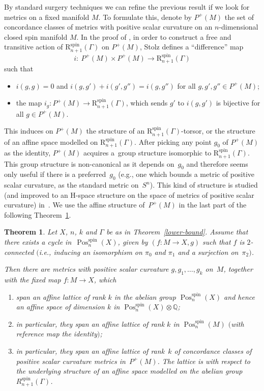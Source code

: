 \documentclass[pdftex]{sigma}
\numberwithin{equation}{section}
\newtheorem{Theorem}{Theorem}[section]
\newcommand{\rationals}{\mathbb{Q}}
\DeclareMathOperator{\Pos}{Pos}
\DeclareMathOperator{\spin}{spin}
\begin{document}
By standard surgery techniques we can refine the previous result if we look
 for metrics on a fixed manifold $M$. To formulate this, denote by $P^+(M)$ the set of concordance classes of metrics with positive scalar curvature on an $n$-dimensional closed spin manifold $M$.
 In the proof of \cite[Theorem~5.4]{Stolz}, in order to construct a free and
 transitive action of $\mathrm{R}^{\spin}_{n+1}(\Gamma)$ on $P^+(M)$, Stolz
 defines a ``difference'' map
 \begin{equation}\label{i-map}i\colon \ P^+(M)\times P^+(M)\to \mathrm{R}^{\spin}_{n+1}(\Gamma)\end{equation} such that
 \begin{itemize}\itemsep=0pt
 \item $i(g,g)=0$ and $i(g,g')+i(g',g'')= i(g,g'')$ for all $g,g',g''\in P^+(M)$;
 \item the map $i_g\colon P^+(M)\to \mathrm{R}^{\spin}_{n+1}(\Gamma)$, which sends $g'$ to $i(g,g')$ is bijective for all $g\in P^+(M)$.
 \end{itemize}
 This induces on $P^+(M)$ the structure of an
 $\mathrm{R}^{\spin}_{n+1}(\Gamma)$-torsor, or the structure of an affine space
 modelled on $\mathrm{R}^{\spin}_{n+1}(\Gamma)$.
 After picking any point $g_0$ of
 $P^+(M)$
 as the identity,
 $P^+(M)$
 acquires a~group structure isomorphic to
 $\mathrm{R}^{\spin}_{n+1}(\Gamma)$. This group structure is
 non-canonical as it depends on~$g_0$ and therefore seems only useful if there is a preferred~$g_0$
 (e.g., one which bounds a metric of positive scalar curvature, as the standard
 metric on~$S^n$). This kind of structure is studied (and improved to an
 H-space structure on the space of metrics of positive scalar
 curvature) in~\cite{Frenck}. We use the affine structure of~$P^+(M)$
 in the last part of the following Theorem~\ref{rank>k}.

 \begin{Theorem}\label{rank>k}
 Let $X$, $n$, $k$ and $\Gamma$ be as in Theorem~{\rm \ref{lower-bound}}.
 Assume that there exists a cycle in~$\Pos^{\spin}_n(X)$, given by $(f\colon M\to X, g)$ such that $f$ is $2$-connected $($i.e., inducing an isomorphism on $\pi_0$ and $\pi_1$ and a surjection on~$\pi_2)$.

 Then there are metrics with positive scalar curvature $g, g_1,\dots,g_k$ on~$M$, together with the
 fixed map $f\colon M\to X$, which
 \begin{enumerate}\itemsep=0pt
 \item[$(1)$] span an affine lattice of rank $k$ in
 the abelian group $\Pos^{\spin}_n(X)$ and hence an affine space of dimension $k$ in
 $\Pos^{\spin}_n(X)\otimes\rationals$;
 \item[$(2)$] in particular, they span an affine lattice of rank $k$
 in $\Pos^{\spin}_n(M)$ $($with reference map the identity$)$;
 \item[$(3)$] in particular, they span an affine lattice of rank~$k$ of concordance classes of positive
 scalar curvature metrics in~$P^+(M)$. The lattice is
 with respect to the underlying
 structure of an affine space modelled on the abelian group~$R^{\spin}_{n+1}(\Gamma)$.
 \end{enumerate}
 \end{Theorem}
\end{document}
